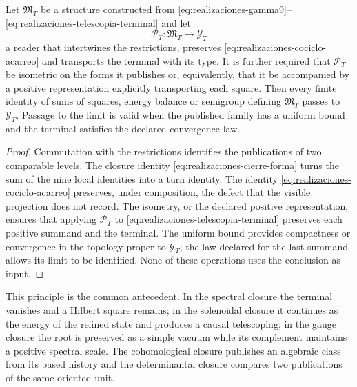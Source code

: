 \begin{proposition}
\label{prop:realizaciones-transporte-especializado}
Let \(\mathfrak M_T\) be a structure constructed from
\eqref{eq:realizaciones-gamma9}--\eqref{eq:realizaciones-telescopia-terminal}
and let
\[
 \mathcal P_T:\mathfrak M_T\longrightarrow\mathcal Y_T
\]
a reader that intertwines the restrictions, preserves
\eqref{eq:realizaciones-cociclo-acarreo} and transports the terminal with its type.
It is further required that \(\mathcal P_T\) be isometric on the forms it
publishes or, equivalently, that it be accompanied by a positive
representation explicitly transporting each square. Then every finite identity
of sums of squares, energy balance or semigroup defining
\(\mathfrak M_T\) passes to \(\mathcal Y_T\). Passage to the
limit is valid when the published family has a uniform bound and the
terminal satisfies the declared convergence law.
\end{proposition}

\begin{proof}
Commutation with the restrictions identifies the publications of two
comparable levels. The closure identity
\eqref{eq:realizaciones-cierre-forma} turns the sum of the nine
local identities into a turn identity. The identity
\eqref{eq:realizaciones-cociclo-acarreo} preserves, under composition, the
defect that the visible projection does not record. The isometry, or the
declared positive representation, ensures that applying \(\mathcal P_T\) to
\eqref{eq:realizaciones-telescopia-terminal} preserves each positive summand
and the terminal. The uniform bound provides compactness or convergence in the
topology proper to \(\mathcal Y_T\); the law declared for the last
summand allows its limit to be identified. None of these operations uses
the conclusion as input.
\end{proof}

This principle is the common antecedent. In the spectral closure the terminal
vanishes and a Hilbert square remains; in the solenoidal closure it continues
as the energy of the refined state and produces a causal telescoping; in the
gauge closure the root is preserved as a simple vacuum while its complement
maintains a positive spectral scale. The cohomological closure publishes an
algebraic class from its based history and the determinantal closure compares
two publications of the same oriented unit.



